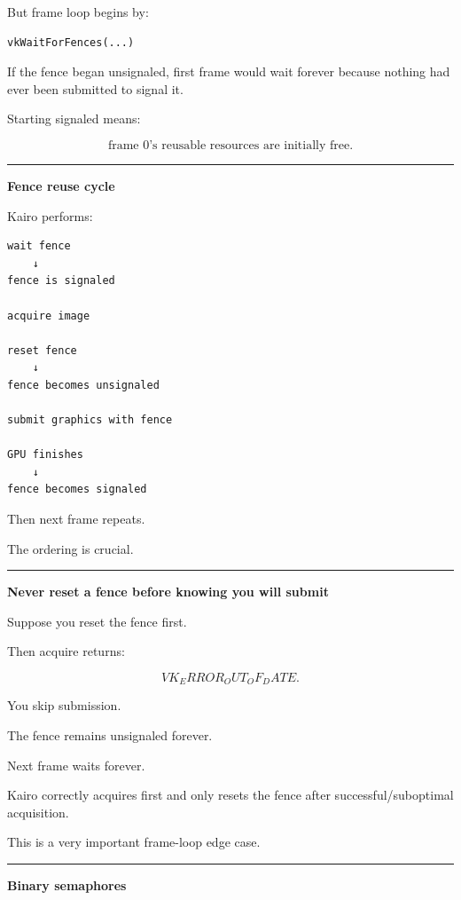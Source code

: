 But frame loop begins by:

\begin{verbatim}
vkWaitForFences(...)
\end{verbatim}

If the fence began unsignaled, first frame would wait forever because nothing had ever been submitted to signal it.

Starting signaled means:

\[
\boxed{
\text{frame 0's reusable resources are initially free}.
}
\]

\begin{center}\rule{0.5\linewidth}{0.5pt}\end{center}

\textbf{Fence reuse cycle}

Kairo performs:

\begin{verbatim}
wait fence
    ↓
fence is signaled

acquire image

reset fence
    ↓
fence becomes unsignaled

submit graphics with fence

GPU finishes
    ↓
fence becomes signaled
\end{verbatim}

Then next frame repeats.

The ordering is crucial.

\begin{center}\rule{0.5\linewidth}{0.5pt}\end{center}

\textbf{Never reset a fence before knowing you will submit}

Suppose you reset the fence first.

Then acquire returns:

\[
VK_ERROR_OUT_OF_DATE.
\]

You skip submission.

The fence remains unsignaled forever.

Next frame waits forever.

Kairo correctly acquires first and only resets the fence after successful/suboptimal acquisition.

This is a very important frame-loop edge case.

\begin{center}\rule{0.5\linewidth}{0.5pt}\end{center}

\textbf{Binary semaphores}

